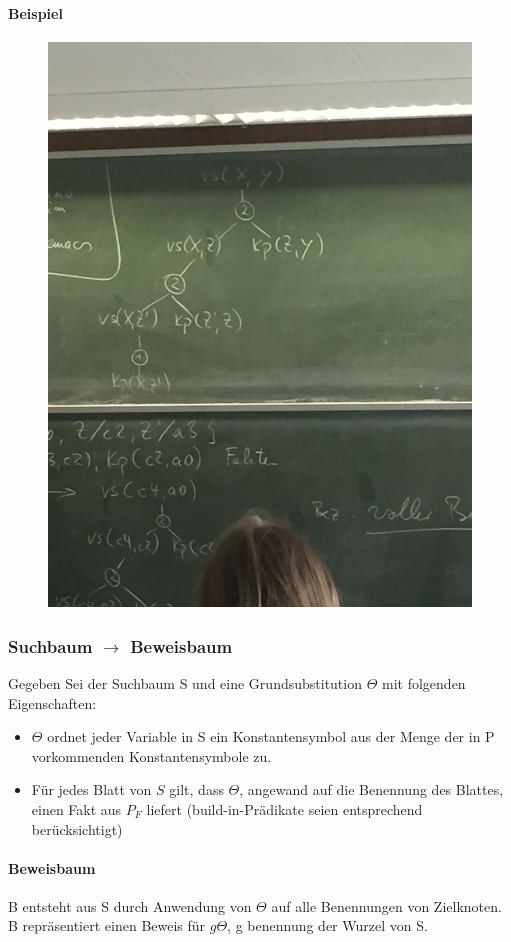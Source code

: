 \documentclass[12pt, a4paper]{article}
\begin{document}
\paragraph{Beispiel}
\begin{figure}[h!]
\centering
\includegraphics[width=0.7\linewidth]{img/img7}
\caption{}
\label{fig:img7}
\end{figure}

\subsubsection*{Suchbaum $\rightarrow$ Beweisbaum}
Gegeben Sei der Suchbaum S und eine Grundsubstitution $\Theta$ mit folgenden Eigenschaften:
\begin{itemize}
\item $\Theta$ ordnet jeder Variable in S ein Konstantensymbol aus der Menge der in P vorkommenden Konstantensymbole zu.
\item Für jedes Blatt von $S$ gilt, dass $\Theta$, angewand auf die Benennung des Blattes, einen Fakt aus $P_F$ liefert (build-in-Prädikate seien entsprechend berücksichtigt)
\end{itemize}

\paragraph{Beweisbaum} B entsteht aus S durch Anwendung von $\Theta$ auf alle Benennungen von Zielknoten. B repräsentiert einen Beweis für $g\Theta$, g benennung der Wurzel von S.
\end{document}
